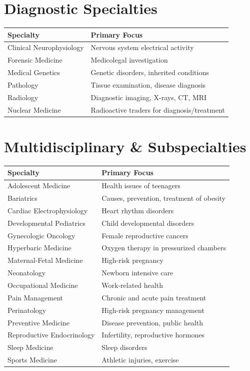 \section*{Diagnostic Specialties}

\begin{tabularx}{\textwidth}{@{}lX@{}}
\toprule
\textbf{Specialty} & \textbf{Primary Focus} \\
\midrule
Clinical Neurophysiology & Nervous system electrical activity \\
Forensic Medicine & Medicolegal investigation \\
Medical Genetics & Genetic disorders, inherited conditions \\
Pathology & Tissue examination, disease diagnosis \\
Radiology & Diagnostic imaging, X-rays, CT, MRI \\
Nuclear Medicine & Radioactive traders for diagnosis/treatment \\
\bottomrule
\end{tabularx}

\section*{Multidisciplinary \& Subspecialties}

\begin{tabularx}{\textwidth}{@{}lX@{}}
\toprule
\textbf{Specialty} & \textbf{Primary Focus} \\
\midrule
Adolescent Medicine & Health issues of teenagers \\
Bariatrics & Causes, prevention, treatment of obesity \\
Cardiac Electrophysiology & Heart rhythm disorders \\
Developmental Pediatrics & Child developmental disorders \\
Gynecologic Oncology & Female reproductive cancers \\
Hyperbaric Medicine & Oxygen therapy in pressurized chambers \\
Maternal-Fetal Medicine & High-risk pregnancy \\
Neonatology & Newborn intensive care \\
Occupational Medicine & Work-related health \\
Pain Management & Chronic and acute pain treatment \\
Perinatology & High-risk pregnancy management \\
Preventive Medicine & Disease prevention, public health \\
Reproductive Endocrinology & Infertility, reproductive hormones \\
Sleep Medicine & Sleep disorders \\
Sports Medicine & Athletic injuries, exercise \\
\bottomrule
\end{tabularx}


